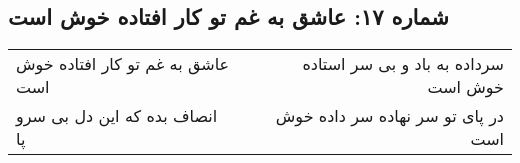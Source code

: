 \begin{center}
\section*{شماره ۱۷: عاشق به غم تو کار افتاده خوش است}
\label{sec:017}
\begin{longtable}{l p{0.5cm} r}
عاشق به غم تو کار افتاده خوش است
&&
سرداده به باد و بی سر استاده خوش است
\\
انصاف بده که این دل بی سرو پا
&&
در پای تو سر نهاده سر داده خوش است
\\
\end{longtable}
\end{center}
